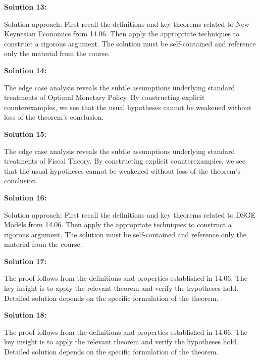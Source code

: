 \documentclass[12pt,a4paper]{exam}
\begin{document}
\vspace{0.5cm}

\textbf{Solution 13:}

Solution approach: First recall the definitions and key theorems related to New Keynesian Economics from 14.06. Then apply the appropriate techniques to construct a rigorous argument. The solution must be self-contained and reference only the material from the course.

\vspace{0.5cm}

\textbf{Solution 14:}

The edge case analysis reveals the subtle assumptions underlying standard treatments of Optimal Monetary Policy. By constructing explicit counterexamples, we see that the usual hypotheses cannot be weakened without loss of the theorem's conclusion.

\vspace{0.5cm}

\textbf{Solution 15:}

The edge case analysis reveals the subtle assumptions underlying standard treatments of Fiscal Theory. By constructing explicit counterexamples, we see that the usual hypotheses cannot be weakened without loss of the theorem's conclusion.

\vspace{0.5cm}

\textbf{Solution 16:}

Solution approach: First recall the definitions and key theorems related to DSGE Models from 14.06. Then apply the appropriate techniques to construct a rigorous argument. The solution must be self-contained and reference only the material from the course.

\vspace{0.5cm}

\textbf{Solution 17:}

The proof follows from the definitions and properties established in 14.06. The key insight is to apply the relevant theorem and verify the hypotheses hold. Detailed solution depends on the specific formulation of the theorem.

\vspace{0.5cm}

\textbf{Solution 18:}

The proof follows from the definitions and properties established in 14.06. The key insight is to apply the relevant theorem and verify the hypotheses hold. Detailed solution depends on the specific formulation of the theorem.
\end{document}
